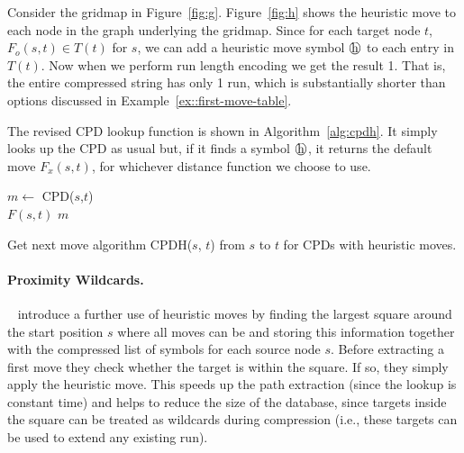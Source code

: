 \ignore
{
\begin{example}
  Consider the gridmap in Figure~\ref{fig:g}. 
  Figure~\ref{fig:h} shows the heuristic move to each node in the graph underlying the gridmap.
  Since for each target node $t$, $F_o(s,t) \in T(t)$ for $s$,
  we can add a heuristic move symbol $\heur$
  to each entry in $T(t)$.
  Now when we perform run length encoding we get the result
  1\heur. That is, the entire compressed string has only 1 run,
  which is substantially shorter than options discussed in Example~\ref{ex::first-move-table}.
\end{example}

The revised CPD lookup function is shown in Algorithm~\ref{alg:cpdh}.
It simply looks up the CPD as usual but, if it finds a symbol $\heur$, it
returns the default move $F_x(s,t)$, for whichever distance function 
we choose to use.

\begin{algorithm}
   {$m \gets$ \textsf{CPD}($s$,$t$) \\
         {\Return $F(s,t)$}
         {\Return $m$}
         }
\caption{Get next move algorithm \textsf{CPDH}($s$, $t$) from $s$ to $t$ for CPDs with heuristic moves.}
\label{alg:cpdh}
\end{algorithm}
}

\paragraph{Proximity Wildcards.}
\citeauthor{icaps19b}~ introduce a further use of heuristic moves by finding
the largest square around the start position $s$ where all moves can
be \heur{} and storing this information together with the compressed
list of symbols for each source node $s$. 
Before extracting a first move they check whether the target is within 
the square. If so, they simply apply the heuristic move.  
This speeds up the path extraction (since the lookup is constant time) and
helps to reduce the size of the database, since targets inside the
square can be treated as wildcards during compression (i.e., these targets
can be used to extend any existing run).



